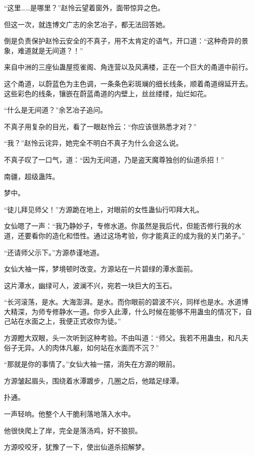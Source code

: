 
\begin{this_body}

“这里……是哪里？”赵怜云望着窗外，面带惊异之色。

但这一次，就连博文广志的余艺冶子，都无法回答她。

倒是负责保护赵怜云安全的不真子，用不太肯定的语气，开口道：“这种奇异的景象，难道就是无间道？！”

来自中洲的三座仙蛊屋揽雀阁、角连营以及风满楼，正在一个巨大的甬道中前行。

这个甬道，以蔚蓝色为主色调，一条条色彩斑斓的细长线条，顺着甬道绵延开去。这些彩色的线条，镶嵌在蔚蓝甬道的内壁上，丝丝缕缕，灿烂如花。

“什么是无间道？”余艺冶子追问。

不真子用复杂的目光，看了一眼赵怜云：“你应该很熟悉才对？”

“我？”赵怜云诧异，她完全不明白不真子为什么会这么说。

不真子叹了一口气，道：“因为无间道，乃是盗天魔尊独创的仙道杀招！”

南疆，超级蛊阵。

梦中。

“徒儿拜见师父！”方源跪在地上，对眼前的女性蛊仙行叩拜大礼。

女仙嗯了一声：“我乃静妙子，专修水道。你虽然是我后代，但能否修行我的水道，还要看你的造化和悟性。通过这场考验，你才能真正的成为我的关门弟子。”

“还请师父示下。”方源恭谨地道。

女仙大袖一挥，梦境顿时改变。方源站在一片碧绿的潭水面前。

这片潭水，幽绿可人，波澜不兴，宛若一块巨大的玉石。

“长河滚荡，是水。大海澎湃。是水。而你眼前的碧波不兴，同样也是水。水道博大精深，为师专修静水一道。你步入此潭，什么时候在能够不用蛊虫的情况下，自己站在水面之上，我便正式收你为徒。”

方源瞪大双眼，头一次听到这种考验。不由叫道：“师父。我若不用蛊虫，和凡夫俗子无异。人的肉体凡躯，如何站在水面而不沉？”

“那就是你的事情了。”女仙大袖一摆，消失在方源的眼前。

方源皱起眉头，围绕着水潭踱步，几圈之后，他踏足绿潭。

扑通。

一声轻响。他整个人干脆利落地落入水中。

他很快爬上了岸，完全是落汤鸡，好不狼狈。

方源咬咬牙，犹豫了一下，使出仙道杀招解梦。


\end{this_body}

